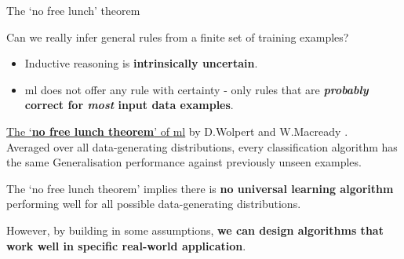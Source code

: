 
\begin{frame}[t]{The `no free lunch' theorem}

Can we really infer general rules from a finite set of training examples?
\begin{itemize}
  \item Inductive reasoning is {\bf intrinsically uncertain}.
  \item \gls{ml} does not offer any rule with certainty - 
  only rules that are {\bf {\em probably} correct for {\em most} input data examples}.
\end{itemize}

\vspace{0.1cm}

\begin{blockexample}{}
\underline{The `{\bf no free lunch theorem}' of  \gls{ml}} 
by D.Wolpert and W.Macready \cite{NoFreeLunch}.\\
\vspace{0.1cm}
{\small
Averaged over all data-generating distributions,
every classification algorithm has the same Generalisation performance
against previously unseen examples.\\
}
\end{blockexample}

\vspace{0.1cm}

The `no free lunch theorem' implies there is 
{\bf no universal learning algorithm} 
performing well for all possible data-generating distributions.

\vspace{0.2cm}

However, by building in some assumptions,
{\bf we can design algorithms that work well in specific real-world application}.

\end{frame}
